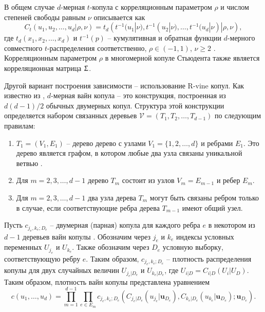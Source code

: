 В общем случае $d$-мерная $t$-копула с корреляционным параметром $\rho$ и числом степеней свободы равным $\nu$ описывается как
\begin{equation} \label{tCop}
C_{t}(u_1,u_2,\ldots,u_d|\rho, \nu) = t_d \left( t^{-1} (u_1|\nu), t^{-1} (u_2|\nu), \ldots, t^{-1} (u_d|\nu) | \rho, \nu \right),
\end{equation}
где $t_d(x_1,x_2,\dots,x_d)$ и $t^{-1}(p)$ -- кумулятивная и обратная функции $d$-мерного совместного $t$-распределения соответственно, $\rho \in (-1, 1)$, $\nu \ge 2$ \cite{Emb2001}. 
Корреляционным параметром $\rho$ в многомерной копуле Стьюдента также является корреляционная матрица $\Upsigma$.

Другой вариант построения зависимости -- использование R-vine копул. Как известно из \cite{Bedfort2002}, $d$-мерная вайн копула -- это конструкция, построенная из $d(d - 1)/2$ обычных двумерных копул. Структура этой конструкции определяется набором связанных деревьев $\mathcal{V} = (T_1, T_2, \ldots, T_ {d-1})$ по следующим правилам:

\begin{enumerate}[label=(\roman*),labelwidth=1cm,leftmargin=1cm]
\item $T_1 = (V_1,E_1)$ -- дерево дерево с узлами $V_1 = \{1, 2, \ldots, d\}$ и ребрами $E_1$. 
Это дерево является графом, в котором любые два узла связаны уникальной ветвью \cite{Diestel2005}.

\item Для $m = 2,3,\ldots,d - 1$ дерево $T_m$ состоит из узлов $V_m = E_{m-1}$ и ребер $E_m$.

\item \label{iii} Для $m = 2,3,\ldots,d - 1$ два узла дерева $T_m$ могут быть связаны ребром только в случае, если соответствующие ребра дерева $T_{m-1}$ имеют общий узел.
\end{enumerate}

Пусть $c_{j_e,k_e;D_e}$ -- двумерная (парная) копула для каждого ребра $e$ в некотором из $d - 1$ деревьев вайн копулы \cite{Czado2010}. Обозначим через $j_e$ и $k_e$ индексы условных переменных $U_{j_e}$ и $U_{k_e}$. Также обозначим через $D_e$ условную выборку, соответствующую ребру $e$. Таким образом, $c_{j_e,k_e;D_e}$ -- плотность распределения копулы для двух случайных величин $U_{j_e|D_e}$ и $U_{k_e|D_e}$, где $U_{i|D} = C_{i|D} (U_i|U_D)$. Таким образом, плотность вайн копулы представлена уравнением
%
\begin{equation}
    c(u_1, \ldots, u_d) = \prod_{m=1}^{d-1} \prod_{e \in E_m} c_{j_e,k_e;D_e} \left( C_{j_e|D_e} (u_{j_e}|\textbf{u}_{D_e}), C_{k_e|D_e} (u_{k_e}|\textbf{u}_{D_e}); \textbf{u}_{D_e} \right).
\end{equation}


